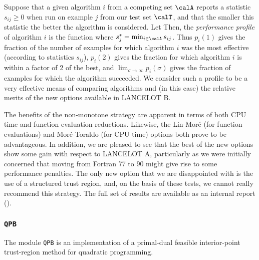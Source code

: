 \documentclass[twoside]{article}
\newcommand{\lana}{{\sf LANCELOT A}}
\newcommand{\lanb}{{\sf LANCELOT B}}
\newcommand{\ltsubsubsection}[1]{\subsubsection{{\tt #1}} \label{#1}}
\begin{document}
Suppose that a given algorithm $i$ from a competing set $\calA$
reports a statistic $s_{ij} \geq 0$
when run on example $j$ from our test set $\calT$,
and that the smaller this statistic the better the algorithm is considered.
Let
Then, the {\em performance profile} of algorithm $i$ is the function
where $s^*_j = \min_{i \in \calA} s_{ij}$.
Thus $p_i(1)$ gives the fraction of the number of examples for which
algorithm $i$ was the most effective (according to statistics $s_{ij}$),
$p_i(2)$ gives
the fraction for which algorithm $i$
is within a factor of 2 of the best, and $\lim_{\sigma\longrightarrow\infty}
p_i(\sigma)$ gives the fraction of examples for which the algorithm
succeeded. We consider such a profile to be a very effective means
of comparing algorithms and (in this case)
the relative merits of the new options available in \lanb.

The benefits of the non-monotone strategy
are apparent in terms of both CPU time and function evaluation reductions.
Likewise, the Lin-Mor\'{e} (for function evaluations)
and Mor\'{e}-Toraldo (for CPU time) options both prove to be advantageous.
In addition, we are pleased to see that
the best of the new options show some gain with respect to
\lana, particularly as we were initially concerned that moving from
Fortran 77 to 90 might give rise to some performance penalties.
The only new option that we are disappointed with is the use of a
structured trust region, and, on the basis of these tests,
we cannot really recommend this strategy. The full set of results
are available as an internal report ().

\ltsubsubsection{QPB}

The module {\tt QPB} is an implementation of a primal-dual
feasible interior-point trust-region method for quadratic programming.
\end{document}
